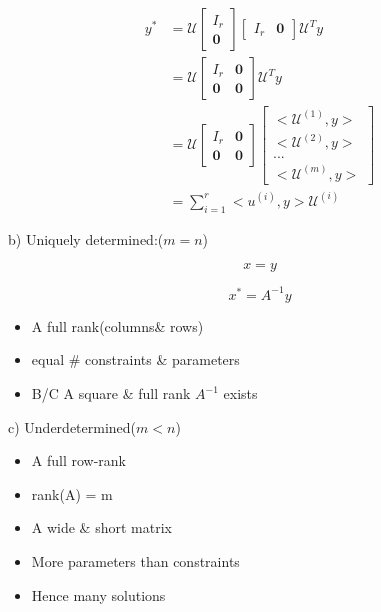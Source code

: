 \begin{align*}
y^{*} &= \mathcal{U}
\begin{bmatrix}
I_r\\
\textbf{0}
\end{bmatrix}
\begin{bmatrix}
I_r & \textbf{0}
\end{bmatrix}
\mathcal{U}^Ty\\
&= \mathcal{U}
\begin{bmatrix}
I_r& \textbf{0}\\
\textbf{0} & \textbf{0}
\end{bmatrix}
\mathcal{U}^Ty\\
&= \mathcal{U}
\begin{bmatrix}
I_r& \textbf{0}\\
\textbf{0} &  \textbf{0}
\end{bmatrix}
\begin{bmatrix}
<\mathcal{U}^{(1)}, y>\\
<\mathcal{U}^{(2)}, y>\\
...\\
<\mathcal{U}^{(m)}, y>
\end{bmatrix}\\
&= \sum^r_{i=1}<u^{(i)}, y>\mathcal{U}^{(i)}
\end{align*}

b) Uniquely determined:($m =n$)

\begin{equation*}
[A]x = y
\end{equation*}

\begin{equation*}
x^* = A^{-1}y
\end{equation*}

\begin{itemize}
	\item A full rank(columns\& rows)
	
	\item equal \# constraints \& parameters
	
	\item B/C A square \& full rank $A^{-1}$ exists
\end{itemize}

c) Underdetermined($m<n$)

\begin{itemize}
	\item A full row-rank
	
	\item rank(A) = m
	 
	\item A wide \& short matrix
	
	\item More parameters than constraints
	
	\item Hence many solutions
\end{itemize}

